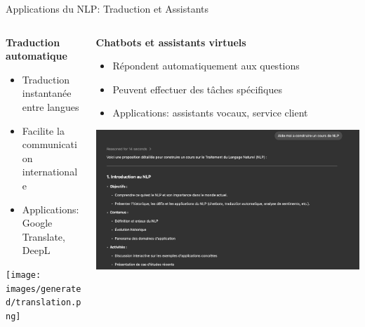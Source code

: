 \documentclass[aspectratio=169,11pt]{beamer}
\begin{document}
\begin{frame}{Applications du NLP: Traduction et Assistants}
    \begin{columns}
        \begin{column}{0.5\textwidth}
            \textbf{Traduction automatique}
            \begin{itemize}
                \item Traduction instantanée entre langues
                \item Facilite la communication internationale
                \item Applications: Google Translate, DeepL
            \end{itemize}
            \vspace{0.3cm}
            \texttt{[image: images/generated/translation.png]}
        \end{column}
        \begin{column}{0.5\textwidth}
            \textbf{Chatbots et assistants virtuels}
            \begin{itemize}
                \item Répondent automatiquement aux questions
                \item Peuvent effectuer des tâches spécifiques
                \item Applications: assistants vocaux, service client
            \end{itemize}
            \vspace{0.3cm}
            \includegraphics[width=\textwidth]{images/chatbot.png}
        \end{column}
    \end{columns}
\end{frame}

\end{document}
